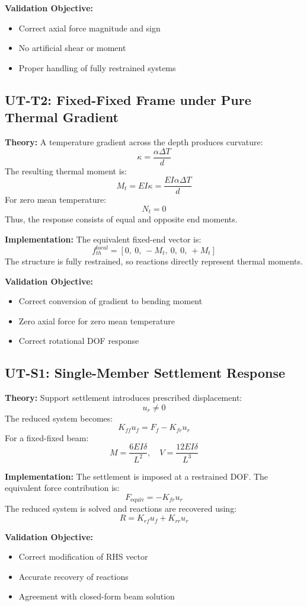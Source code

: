 \textbf{Validation Objective:}
\begin{itemize}
    \item Correct axial force magnitude and sign
    \item No artificial shear or moment
    \item Proper handling of fully restrained systems
\end{itemize}

\subsection{UT-T2: Fixed-Fixed Frame under Pure Thermal Gradient}

\textbf{Theory:}  
A temperature gradient across the depth produces curvature:
\[
\kappa = \frac{\alpha \Delta T}{d}
\]
The resulting thermal moment is:
\[
M_t = EI\kappa = \frac{EI\alpha \Delta T}{d}
\]
For zero mean temperature:
\[
N_t = 0
\]
Thus, the response consists of equal and opposite end moments.

\textbf{Implementation:}  
The equivalent fixed-end vector is:
\[
f_{th}^{local} = [0,\ 0,\ -M_t,\ 0,\ 0,\ +M_t]
\]
The structure is fully restrained, so reactions directly represent thermal moments.

\textbf{Validation Objective:}
\begin{itemize}
    \item Correct conversion of gradient to bending moment
    \item Zero axial force for zero mean temperature
    \item Correct rotational DOF response
\end{itemize}

\subsection{UT-S1: Single-Member Settlement Response}

\textbf{Theory:}  
Support settlement introduces prescribed displacement:
\[
u_r \neq 0
\]
The reduced system becomes:
\[
K_{ff} u_f = F_f - K_{fr} u_r
\]
For a fixed-fixed beam:
\[
M = \frac{6EI\delta}{L^2}, \quad V = \frac{12EI\delta}{L^3}
\]

\textbf{Implementation:}  
The settlement is imposed at a restrained DOF. The equivalent force contribution is:
\[
F_{\text{equiv}} = -K_{fr} u_r
\]
The reduced system is solved and reactions are recovered using:
\[
R = K_{rf} u_f + K_{rr} u_r
\]

\textbf{Validation Objective:}
\begin{itemize}
    \item Correct modification of RHS vector
    \item Accurate recovery of reactions
    \item Agreement with closed-form beam solution
\end{itemize}


